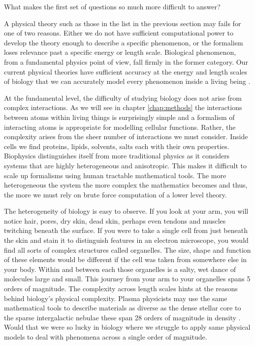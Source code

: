 What makes the first set of questions so much more difficult to answer?

A physical theory such as those in the list in the previous section may fails for one of two reasons. Either we do not have sufficient computational power to develop the theory enough to describe a specific phenomenon, or the formalism loses relevance past a specific energy or length scale. Biological phenomenon, from a fundamental physics point of view, fall firmly in the former category. Our current physical theories have sufficient accuracy at the energy and length scales of biology that we can accurately model every phenomenon inside a living being \cite{carroll2021}. 

At the fundamental level, the difficulty of studying biology does not arise from complex interactions. As we will see in chapter \ref{chap:methods} the interactions between atoms within living things is surprisingly simple and a formalism of interacting atoms is appropriate for modelling cellular functions. Rather, the complexity arises from the sheer number of interactions we must consider. Inside cells we find proteins, lipids, solvents, salts each with their own properties. Biophysics distinguishes itself from more traditional physics as it considers systems that are highly heterogeneous and anisotropic. This makes it difficult to scale up formalisms using human tractable mathematical tools. The more heterogeneous the system the more complex the mathematics becomes and thus, the more we must rely on brute force computation of a lower level theory.


The heterogeneity of biology is easy to observe. If you look at your arm, you will notice hair, pores, dry skin, dead skin, perhaps even tendons and muscles twitching beneath the surface. If you were to take a single cell from just beneath the skin and stain it to distinguish features in an electron microscope, you would find all sorts of complex structures called organelles. The size, shape and function of these elements would be different if the cell was taken from somewhere else in your body. Within and between each those organelles is a salty, wet dance of molecules large and small. This journey from your arm to your organelles spans 5 orders of magnitude. The complexity across length scales hints at the reasons behind biology's physical complexity. Plasma physicists may use the same mathematical tools to describe materials as diverse as the dense stellar core to the sparse intergalactic nebulae these span 28 orders of magnitude in density \cite{chen2018}. Would that we were so lucky in biology where we struggle to apply same physical models to deal with phenomena across a single order of magnitude.  

